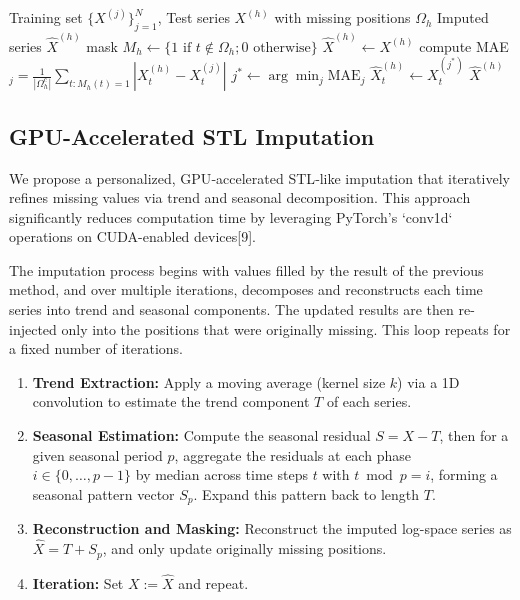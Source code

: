\documentclass[10pt,twocolumn]{article}
\begin{document}
	\begin{algorithm}[H]
		\caption{Household Nearest-Neighbor Imputation}
		\begin{algorithmic}[1]
			\Require Training set $\{X^{(j)}\}_{j=1}^N$, Test series $X^{(h)}$ with missing positions $\Omega_h$
			\Ensure Imputed series $\hat{X}^{(h)}$
			\State mask $M_h \gets \{1 \text{ if } t \notin \Omega_h; 0 \text{ otherwise}\}$
			\State $\hat{X}^{(h)} \gets X^{(h)}$
			\State compute MAE$_j = \frac{1}{|\Omega_h^c|} \sum_{t: M_h(t)=1} |X^{(h)}_t - X^{(j)}_t|$
			\EndFor
			\State $j^* \gets \arg\min_j \text{MAE}_j$
			\State $\hat{X}^{(h)}_t \gets X^{(j^*)}_t$
			\EndFor
			\State \Return $\hat{X}^{(h)}$
		\end{algorithmic}
	\end{algorithm}
	
	\subsection{GPU-Accelerated STL Imputation}
We propose a personalized, GPU‑accelerated STL‑like imputation that iteratively refines missing values via trend and seasonal decomposition. This approach significantly reduces computation time by leveraging PyTorch's `conv1d` operations on CUDA-enabled devices[9].

The imputation process begins with values filled by the result of the previous method, and over multiple iterations, decomposes and reconstructs each time series into trend and seasonal components. The updated results are then re-injected only into the positions that were originally missing. This loop repeats for a fixed number of iterations.

	\begin{enumerate}
		\item \textbf{Trend Extraction:} Apply a moving average (kernel size $k$) via a 1D convolution to estimate the trend component $T$ of each series.
		\item \textbf{Seasonal Estimation:} Compute the seasonal residual $S = X - T$, then for a given seasonal period $p$, aggregate the residuals at each phase $i \in \{0, \dots, p-1\}$ by median across time steps $t$ with $t \bmod p = i$, forming a seasonal pattern vector $S_p$. Expand this pattern back to length $T$.
		\item \textbf{Reconstruction and Masking:} Reconstruct the imputed log-space series as $\hat{X} = T + S_p$, and only update originally missing positions.
		\item \textbf{Iteration:} Set $X := \hat{X}$ and repeat.
	\end{enumerate}
	
\end{document}
